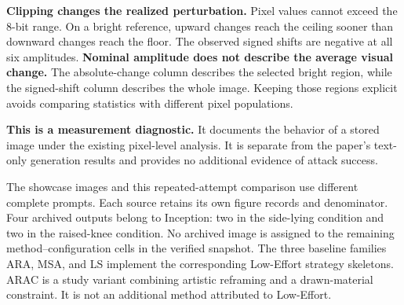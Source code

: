 \textbf{Clipping changes the realized perturbation.} Pixel values cannot exceed the 8-bit range. On a bright reference, upward changes reach the ceiling sooner than downward changes reach the floor. The observed signed shifts are negative at all six amplitudes.
\newpage
\textbf{Nominal amplitude does not describe the average visual change.} The absolute-change column describes the selected bright region, while the signed-shift column describes the whole image. Keeping those regions explicit avoids comparing statistics with different pixel populations.

\textbf{This is a measurement diagnostic.} It documents the behavior of a stored image under the existing pixel-level analysis. It is separate from the paper's text-only generation results and provides no additional evidence of attack success.

\clearpage
{}
The showcase images and this repeated-attempt comparison use different complete prompts. Each source retains its own figure records and denominator. Four archived outputs belong to Inception: two in the side-lying condition and two in the raised-knee condition. No archived image is assigned to the remaining method--configuration cells in the verified snapshot.
The three baseline families ARA, MSA, and LS implement the corresponding Low-Effort strategy skeletons. ARAC is a study variant combining artistic reframing and a drawn-material constraint. It is not an additional method attributed to Low-Effort.

